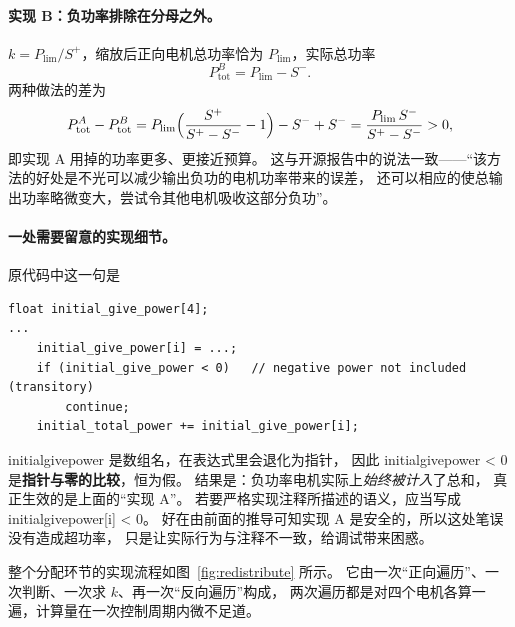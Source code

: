 \documentclass[cn,blue,11pt,device=normal]{elegantnote}
\newcommand{\code}[1]{{\ttfamily\small\def\_{\textunderscore\allowbreak}#1}}
\newcommand{\Plim}{P_{\mathrm{lim}}{}}
\begin{document}
\paragraph{实现 B：负功率排除在分母之外。}
$k = \Plim/S^{+}$，缩放后正向电机总功率恰为 $\Plim$，实际总功率
\begin{equation}\label{eq:caseB}
  P_{\mathrm{tot}}^{B} = \Plim - S^{-} .
\end{equation}
两种做法的差为
\begin{equation}
  P_{\mathrm{tot}}^{A} - P_{\mathrm{tot}}^{B}
  = \Plim\Bigl(\frac{S^{+}}{S^{+}-S^{-}}-1\Bigr) - S^{-} + S^{-}
  = \frac{\Plim\,S^{-}}{S^{+}-S^{-}} > 0 ,
\end{equation}
即实现 A 用掉的功率更多、更接近预算。
这与开源报告中的说法一致——“该方法的好处是不光可以减少输出负功的电机功率带来的误差，
还可以相应的使总输出功率略微变大，尝试令其他电机吸收这部分负功”。

\paragraph{一处需要留意的实现细节。}
原代码中这一句是
\begin{lstlisting}[style=cstyle, numbers=none]
float initial_give_power[4];
...
    initial_give_power[i] = ...;
    if (initial_give_power < 0)   // negative power not included (transitory)
        continue;
    initial_total_power += initial_give_power[i];
\end{lstlisting}
\code{initial\_give\_power} 是数组名，在表达式里会退化为指针，
因此 \code{initial\_give\_power < 0} 是\textbf{指针与零的比较}，恒为假。
结果是：负功率电机实际上\emph{始终被计入}了总和，
真正生效的是上面的“实现 A”。
若要严格实现注释所描述的语义，应当写成 \code{initial\_give\_power[i] < 0}。
好在由前面的推导可知实现 A 是安全的，所以这处笔误没有造成超功率，
只是让实际行为与注释不一致，给调试带来困惑。

整个分配环节的实现流程如图~\ref{fig:redistribute} 所示。
它由一次“正向遍历”、一次判断、一次求 $k$、再一次“反向遍历”构成，
两次遍历都是对四个电机各算一遍，计算量在一次控制周期内微不足道。
\end{document}
